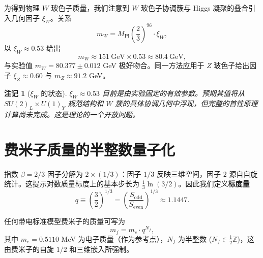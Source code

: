 \documentclass[12pt,a4paper]{article}
\newtheorem{remark}{注记}
\begin{document}
	为得到物理 \(W\) 玻色子质量，我们注意到 \(W\) 玻色子协调簇与 Higgs 凝聚的叠合引入几何因子 \(\xi_W\)。关系
	\begin{equation}
		m_W = M_{\mathrm{Pl}} \left(\frac{2}{3}\right)^{96} \cdot \xi_W,
		\label{eq:mw}
	\end{equation}
	以 \(\xi_W \approx 0.53\) 给出
	\begin{equation}
		m_W \approx 151\ \mathrm{GeV} \times 0.53 \approx 80.4\ \mathrm{GeV},
	\end{equation}
	与实验值 \(m_W = 80.377 \pm 0.012\) GeV 极好吻合。同一方法应用于 \(Z\) 玻色子给出因子 \(\xi_Z \approx 0.60\) 与 \(m_Z \approx 91.2\) GeV。
	
	\begin{remark}[\(\xi_W\) 的状态]
		\(\xi_W \approx 0.53\) 目前是由实验固定的有效参数。预期其值将从 \(SU(2)_L \times U(1)_Y\) 规范结构和 \(W\) 簇的具体协调几何中浮现，但完整的首性原理计算尚未完成。这是理论的一个开放问题。
	\end{remark}
	
	\section{费米子质量的半整数量子化}
	
	指数 \(\beta = 2/3\) 因子分解为 \(2 \times (1/3)\)：因子 \(1/3\) 反映三维空间，因子 \(2\) 源自自旋统计。这提示对数质量标度上的基本步长为 \(\frac{1}{3}\ln(3/2)\)。因此我们定义\textbf{标度量}
	\begin{equation}
		q \equiv \left(\frac{3}{2}\right)^{1/3} = \left(\frac{S_{\mathrm{odd}}}{S_{\mathrm{even}}}\right)^{1/3} \approx 1.1447.
	\end{equation}
	
	任何带电标准模型费米子的质量可写为
	\begin{equation}
		\boxed{m_f = m_e \cdot q^{N_f}},
		\label{eq:mass-quantization}
	\end{equation}
	其中 \(m_e = 0.5110\) MeV 为电子质量（作为参考点），\(N_f\) 为半整数 (\(N_f \in \frac{1}{2}\mathbb{Z}\))，这由费米子的自旋 \(1/2\) 和三维嵌入所强制。
	
\end{document}
